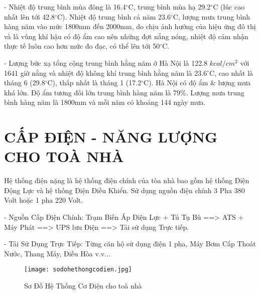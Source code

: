 	- Nhiệt độ trung bình mùa đông là 16.4$^{\circ}$C, trung bình mùa hạ 29.2$^{\circ}$C (lúc cao nhất lên tới 42.8$^{\circ}$C). Nhiệt độ trung bình cả năm 23.6$^{\circ}$C, lượng mưa trung bình hàng năm vào mức 1800mm đến 2000mm, do chịu ảnh hưởng của hiệu ứng đô thị và là vùng khí hậu có độ ẩm cao nên những đợt nắng nóng, nhiệt độ cảm nhận thực tế luôn cao hơn mức đo đạc, có thể lên tới 50$^{\circ}$C.
	
	- Lượng bức xạ tổng cộng trung bình hằng năm ở Hà Nội là 122.8 $ kcal/cm^{2} $ với 1641 giờ nắng và nhiệt độ không khí trung bình hằng năm là 23.6$^{\circ}$C, cao nhất là tháng 6 (29.8$^{\circ}$C), thấp nhất là tháng 1 (17.2$^{\circ}$C). Hà Nội có độ ẩm \& lượng mưa khá lớn. Độ ẩm tương đối lớn trung bình hàng năm là 79\%. Lượng mưa trung bình hàng năm là 1800mm và mỗi năm có khoảng 144 ngày mưa.
	
	\section{CẤP ĐIỆN - NĂNG LƯỢNG CHO TOÀ NHÀ}
	Hệ thống điện nặng là hệ thống điện chính của tòa nhà bao gồm hệ thống Điện Động Lực và hệ thống Điện Điều Khiển. Sử dụng nguồn điện chính 3 Pha 380 Volt hoặc 1 pha 220 Volt.
	
	- Nguồn Cấp Điện Chính:
	Trạm Biến Áp Điện Lực + Tủ Tụ Bù ==> ATS + Máy Phát ==> UPS lưu Điện ==> Tải sử dụng Trực tiếp.
	
	- Tải Sử Dụng Trực Tiếp: Từng căn hộ sử dụng điện 1 pha, Máy Bơm Cấp Thoát Nước, Thang Máy, Điều Hòa v.v...
	
	\begin{figure}[H]
		\centering
		\caption{Sơ Đồ Hệ Thống Cơ Điện cho toà nhà}
		\texttt{[image: sodohethongcodien.jpg]}
	\end{figure}
	